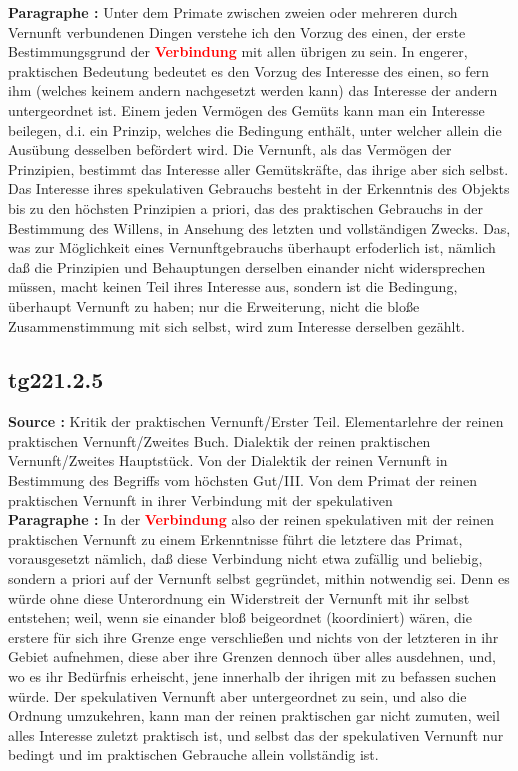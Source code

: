 \documentclass[a4paper,12pt,twoside]{book}
\newcommand{\match}[1]{\textcolor{red}{\textbf{#1}}}
\begin{document}
	\textbf{Paragraphe : }Unter dem Primate zwischen zweien oder mehreren durch Vernunft verbundenen Dingen verstehe ich den Vorzug des einen, der erste Bestimmungsgrund der \match{Verbindung} mit allen übrigen zu sein. In engerer, praktischen Bedeutung bedeutet es den Vorzug des Interesse des einen, so fern ihm (welches keinem andern nachgesetzt werden kann) das Interesse der andern untergeordnet ist. Einem jeden Vermögen des Gemüts kann man ein Interesse beilegen, d.i. ein Prinzip, welches die Bedingung enthält, unter welcher allein die Ausübung desselben befördert wird. Die Vernunft, als das Vermögen der Prinzipien, bestimmt das Interesse aller Gemütskräfte, das ihrige aber sich selbst. Das Interesse  ihres spekulativen Gebrauchs besteht in der Erkenntnis des Objekts bis zu den höchsten Prinzipien a priori, das des praktischen Gebrauchs in der Bestimmung des Willens, in Ansehung des letzten und vollständigen Zwecks. Das, was zur Möglichkeit eines Vernunftgebrauchs überhaupt erfoderlich ist, nämlich daß die Prinzipien und Behauptungen derselben einander nicht widersprechen müssen, macht keinen Teil ihres Interesse aus, sondern ist die Bedingung, überhaupt Vernunft zu haben; nur die Erweiterung, nicht die bloße Zusammenstimmung mit sich selbst, wird zum Interesse derselben gezählt. 
	
	\subsection*{tg221.2.5} 
	\textbf{Source : }Kritik der praktischen Vernunft/Erster Teil. Elementarlehre der reinen praktischen Vernunft/Zweites Buch. Dialektik der reinen praktischen Vernunft/Zweites Hauptstück. Von der Dialektik der reinen Vernunft in Bestimmung des Begriffs vom höchsten Gut/III. Von dem Primat der reinen praktischen Vernunft in ihrer Verbindung mit der spekulativen\\  
	
	\textbf{Paragraphe : }In der \match{Verbindung} also der reinen spekulativen mit der reinen praktischen Vernunft zu einem Erkenntnisse führt die letztere das Primat, vorausgesetzt nämlich, daß diese Verbindung nicht etwa zufällig und beliebig, sondern a priori auf der Vernunft selbst gegründet, mithin notwendig sei. Denn es würde ohne diese Unterordnung ein Widerstreit der Vernunft mit ihr selbst entstehen; weil, wenn sie einander bloß beigeordnet (koordiniert) wären, die erstere für sich ihre Grenze enge verschließen und nichts von der  letzteren in ihr Gebiet aufnehmen, diese aber ihre Grenzen dennoch über alles ausdehnen, und, wo es ihr Bedürfnis erheischt, jene innerhalb der ihrigen mit zu befassen suchen würde. Der spekulativen Vernunft aber untergeordnet zu sein, und also die Ordnung umzukehren, kann man der reinen praktischen gar nicht zumuten, weil alles Interesse zuletzt praktisch ist, und selbst das der spekulativen Vernunft nur bedingt und im praktischen Gebrauche allein vollständig ist. 
	
\end{document}
